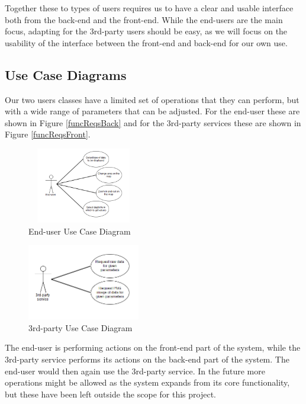 \documentclass[11pt,a4paper,titlepage,oneside]{report}
\begin{document}
  Together these to types of users requires us to have a clear and usable interface both from the back-end and the front-end. While the end-users are the main focus, adapting for the 3rd-party users should be easy, as we will focus on the usability of the interface between the front-end and back-end for our own use.

  \subsection{Use Case Diagrams}
  Our two users classes have a limited set of operations that they can perform, but with a wide range of parameters that can be adjusted. For the end-user these are shown in Figure \ref{funcReqsBack} and for the 3rd-party services these are shown in Figure \ref{funcReqsFront}.
  \begin{figure}[h]
	\begin{center}
	\includegraphics[height=125px,width=186px]{img/useCase_EndUser.png}
	\caption{End-user Use Case Diagram}
	\label{fig:endUserUseDiagram}
	\small
	\end{center}
  \end{figure}

  \begin{figure}[h]
	\begin{center}
	\includegraphics[height=125px,width=186px]{img/useCase_3rdParty.png}
	\caption{3rd-party Use Case Diagram}
	\label{fig:3rdPartyUseDiagram}
	\small
	\end{center}
  \end{figure}

    The end-user is performing actions on the front-end part of the system, while the 3rd-party service performs its actions on the back-end part of the system. The end-user would then again use the 3rd-party service. In the future more operations might be allowed as the system expands from its core functionality, but these have been left outside the scope for this project.
\end{document}

